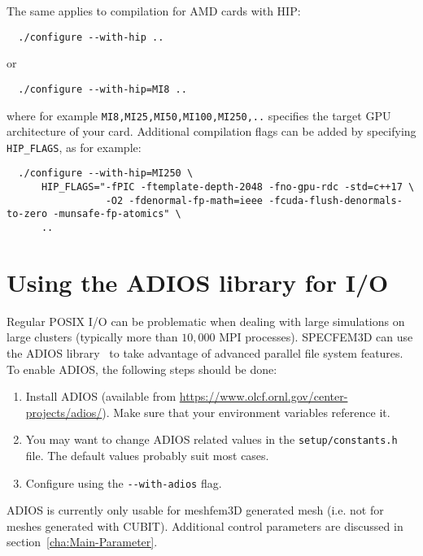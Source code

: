 The same applies to compilation for AMD cards with HIP:
\begin{verbatim}
  ./configure --with-hip ..
\end{verbatim}
or
\begin{verbatim}
  ./configure --with-hip=MI8 ..
\end{verbatim}
where for example \texttt{MI8,MI25,MI50,MI100,MI250,..} specifies the target GPU architecture of your card.
Additional compilation flags can be added by specifying \texttt{HIP\_FLAGS}, as for example:
{\small
\begin{verbatim}
  ./configure --with-hip=MI250 \
      HIP_FLAGS="-fPIC -ftemplate-depth-2048 -fno-gpu-rdc -std=c++17 \
                 -O2 -fdenormal-fp-math=ieee -fcuda-flush-denormals-to-zero -munsafe-fp-atomics" \
      ..
\end{verbatim}
}


\section{Using the ADIOS library for I/O}

Regular POSIX I/O can be problematic when dealing with large simulations on large
clusters (typically more than $10,000$ MPI processes). SPECFEM3D can use the ADIOS library~\cite{Liu2013}
to take advantage of advanced parallel file system features. To enable
ADIOS, the following steps should be done:
\begin{enumerate}
\item Install ADIOS (available from \url{https://www.olcf.ornl.gov/center-projects/adios/}).
Make sure that your environment variables reference it.
\item You may want to change ADIOS related values in the \texttt{setup/constants.h} file.
The default values probably suit most cases.
\item Configure using the \texttt{-{}-with-adios} flag.
\end{enumerate}
ADIOS is currently only usable for meshfem3D generated mesh (i.e. not for meshes generated
with CUBIT). Additional control parameters are discussed in section~\ref{cha:Main-Parameter}.

